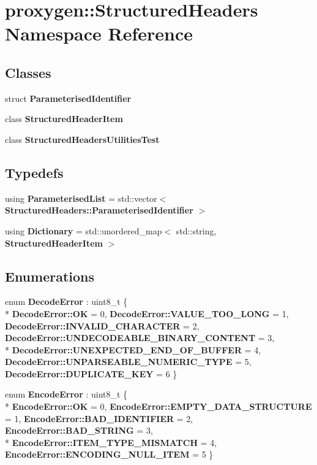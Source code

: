 \section{proxygen\+:\+:Structured\+Headers Namespace Reference}
\label{namespaceproxygen_1_1StructuredHeaders}
\subsection*{Classes}
\begin{DoxyCompactItemize}
\item 
struct {\bf Parameterised\+Identifier}
\item 
class {\bf Structured\+Header\+Item}
\item 
class {\bf Structured\+Headers\+Utilities\+Test}
\end{DoxyCompactItemize}
\subsection*{Typedefs}
\begin{DoxyCompactItemize}
\item 
using {\bf Parameterised\+List} = std\+::vector$<$ {\bf Structured\+Headers\+::\+Parameterised\+Identifier} $>$
\item 
using {\bf Dictionary} = std\+::unordered\+\_\+map$<$ std\+::string, {\bf Structured\+Header\+Item} $>$
\end{DoxyCompactItemize}
\subsection*{Enumerations}
\begin{DoxyCompactItemize}
\item 
enum {\bf Decode\+Error} \+: uint8\+\_\+t \{ \\*
{\bf Decode\+Error\+::\+OK} = 0, 
{\bf Decode\+Error\+::\+V\+A\+L\+U\+E\+\_\+\+T\+O\+O\+\_\+\+L\+O\+NG} = 1, 
{\bf Decode\+Error\+::\+I\+N\+V\+A\+L\+I\+D\+\_\+\+C\+H\+A\+R\+A\+C\+T\+ER} = 2, 
{\bf Decode\+Error\+::\+U\+N\+D\+E\+C\+O\+D\+E\+A\+B\+L\+E\+\_\+\+B\+I\+N\+A\+R\+Y\+\_\+\+C\+O\+N\+T\+E\+NT} = 3, 
\\*
{\bf Decode\+Error\+::\+U\+N\+E\+X\+P\+E\+C\+T\+E\+D\+\_\+\+E\+N\+D\+\_\+\+O\+F\+\_\+\+B\+U\+F\+F\+ER} = 4, 
{\bf Decode\+Error\+::\+U\+N\+P\+A\+R\+S\+E\+A\+B\+L\+E\+\_\+\+N\+U\+M\+E\+R\+I\+C\+\_\+\+T\+Y\+PE} = 5, 
{\bf Decode\+Error\+::\+D\+U\+P\+L\+I\+C\+A\+T\+E\+\_\+\+K\+EY} = 6
 \}
\item 
enum {\bf Encode\+Error} \+: uint8\+\_\+t \{ \\*
{\bf Encode\+Error\+::\+OK} = 0, 
{\bf Encode\+Error\+::\+E\+M\+P\+T\+Y\+\_\+\+D\+A\+T\+A\+\_\+\+S\+T\+R\+U\+C\+T\+U\+RE} = 1, 
{\bf Encode\+Error\+::\+B\+A\+D\+\_\+\+I\+D\+E\+N\+T\+I\+F\+I\+ER} = 2, 
{\bf Encode\+Error\+::\+B\+A\+D\+\_\+\+S\+T\+R\+I\+NG} = 3, 
\\*
{\bf Encode\+Error\+::\+I\+T\+E\+M\+\_\+\+T\+Y\+P\+E\+\_\+\+M\+I\+S\+M\+A\+T\+CH} = 4, 
{\bf Encode\+Error\+::\+E\+N\+C\+O\+D\+I\+N\+G\+\_\+\+N\+U\+L\+L\+\_\+\+I\+T\+EM} = 5
 \}
\end{DoxyCompactItemize}
